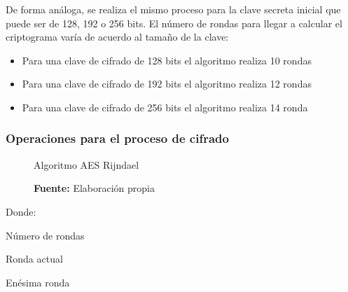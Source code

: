 \documentclass[../main/main.tex]{subfiles}
\begin{document}
    De forma análoga, se realiza el mismo proceso para la clave secreta inicial que puede ser de 128, 192 o 256 bits. El número de rondas para llegar a calcular el criptograma varía de acuerdo al tamaño de la clave:

    \begin{itemize}[noitemsep,nolistsep]
      \item Para una clave de cifrado de 128 bits el algoritmo realiza 10 rondas
      \item Para una clave de cifrado de 192 bits el algoritmo realiza 12 rondas
      \item Para una clave de cifrado de 256 bits el algoritmo realiza 14 ronda
    \end{itemize}

    \subsubsection{Operaciones para el proceso de cifrado}

      \begin{figure}[H]
        \centering
        \caption{Algoritmo AES Rijndael}
        
        \caption*{\textbf{Fuente:} Elaboración propia}
      \end{figure}

      Donde:

      \begin{description}
        \item[N:] Número de rondas
        \item[i:] Ronda actual
        \item[$N_a$:] Enésima ronda
      \end{description}
\end{document}
